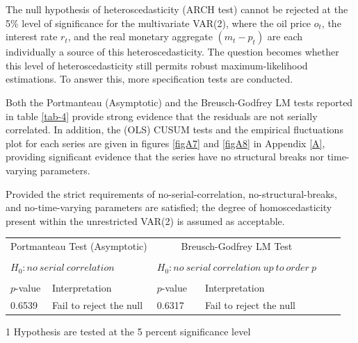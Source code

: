 \documentclass[11pt,preprint, authoryear]{elsarticle}
\let\origtable\table
\let\endorigtable\endtable
\renewenvironment{table}[1][2] {
    \expandafter\origtable\expandafter[H]
} {
    \endorigtable
}
\numberwithin{equation}{section}
\numberwithin{figure}{section}
\numberwithin{table}{section}
\begin{document}
The null hypothesis of heteroscedasticity (ARCH test) cannot be rejected
at the 5\% level of significance for the multivariate VAR(2), where the
oil price \(o_t\), the interest rate \(r_t\), and the real monetary
aggregate \((m_t-p_t)\) are each individually a source of this
heteroscedasticity. The question becomes whether this level of
heteroscedasticity still permits robust maximum-likelihood estimations.
To answer this, more specification tests are conducted.

Both the Portmanteau (Asymptotic) and the Breusch-Godfrey LM tests
reported in table \ref{tab-4} provide strong evidence that the residuals
are not serially correlated. In addition, the (OLS) CUSUM tests and the
empirical fluctuations plot for each series are given in figures
\ref{figA7} and \ref{figA8} in Appendix \ref{A}, providing significant
evidence that the series have no structural breaks nor time-varying
parameters.

Provided the strict requirements of no-serial-correlation,
no-structural-breaks, and no-time-varying parameters are satisfied; the
degree of homoscedasticity present within the unrestricted VAR(2) is
assumed as acceptable.

\begin{table}[t]
\caption{Tests for serial correlation unrestricted VAR(2)'s resduals.}
\begin{center}
\begin{threeparttable}[b]
\begin{tabular}{@{}llllll@{}}
\toprule
\multicolumn{2}{c}{Portmanteau Test (Asymptotic)}&
\multicolumn{2}{c}{Breusch-Godfrey LM Test}
\\
\cmidrule(l){1-2}
\cmidrule(l){3-4}
\\
\multicolumn{2}{l}{$H_0:no \ serial\ correlation$}&
\multicolumn{2}{l}{$H_0:no \ serial\ correlation \ up \ to \ order \ p$}&
\\ \\
\multicolumn{1}{l}{$p$-value\tnote{1}}&
\multicolumn{1}{l}{Interpretation}&
\multicolumn{1}{l}{$p$-value}&
\multicolumn{1}{l}{Interpretation}&
\\   
\midrule    
0.6539 & Fail to reject the null  & 
0.6317 & Fail to reject the null \\
\bottomrule
\end{tabular}
\begin{tablenotes}
    \item[1] Hypothesis are tested at the 5 percent significance level
  \end{tablenotes}
  \end{threeparttable}
\label{tab-4}
\end{center}
\end{table}
\end{document}
